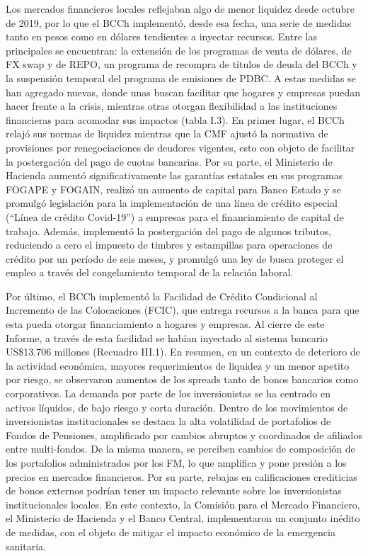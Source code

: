 \documentclass[
]{book}
\begin{document}
Los mercados financieros locales reflejaban algo de menor liquidez desde
octubre de 2019, por lo que el BCCh implementó, desde esa fecha, una serie
de medidas tanto en pesos como en dólares tendientes a inyectar recursos.
Entre las principales se encuentran: la extensión de los programas de venta de
dólares, de FX swap y de REPO, un programa de recompra de títulos de deuda
del BCCh y la suspensión temporal del programa de emisiones de PDBC.
A estas medidas se han agregado nuevas, donde unas buscan facilitar que
hogares y empresas puedan hacer frente a la crisis, mientras otras otorgan
flexibilidad a las instituciones financieras para acomodar sus impactos (tabla
I.3). En primer lugar, el BCCh relajó sus normas de liquidez mientras que la CMF
ajustó la normativa de provisiones por renegociaciones de deudores vigentes,
esto con objeto de facilitar la postergación del pago de cuotas bancarias. Por
su parte, el Ministerio de Hacienda aumentó significativamente las garantías
estatales en sus programas FOGAPE y FOGAIN, realizó un aumento de capital
para Banco Estado y se promulgó legislación para la implementación de una
línea de crédito especial (``Línea de crédito Covid-19'') a empresas para el
financiamiento de capital de trabajo. Además, implementó la postergación del
pago de algunos tributos, reduciendo a cero el impuesto de timbres y estampillas
para operaciones de crédito por un período de seis meses, y promulgó una ley
de busca proteger el empleo a través del congelamiento temporal de la relación
laboral.

Por último, el BCCh implementó la Facilidad de Crédito Condicional al
Incremento de las Colocaciones (FCIC), que entrega recursos a la banca para
que esta pueda otorgar financiamiento a hogares y empresas. Al cierre de este
Informe, a través de esta facilidad se habían inyectado al sistema bancario
US\$13.706 millones (Recuadro III.1).
En resumen, en un contexto de deterioro de la actividad económica, mayores
requerimientos de liquidez y un menor apetito por riesgo, se observaron
aumentos de los spreads tanto de bonos bancarios como corporativos. La
demanda por parte de los inversionistas se ha centrado en activos líquidos,
de bajo riesgo y corta duración. Dentro de los movimientos de inversionistas
institucionales se destaca la alta volatilidad de portafolios de Fondos de
Pensiones, amplificado por cambios abruptos y coordinados de afiliados entre
multi-fondos. De la misma manera, se perciben cambios de composición de
los portafolios administrados por los FM, lo que amplifica y pone presión a
los precios en mercados financieros. Por su parte, rebajas en calificaciones
crediticias de bonos externos podrían tener un impacto relevante sobre
los inversionistas institucionales locales. En este contexto, la Comisión
para el Mercado Financiero, el Ministerio de Hacienda y el Banco Central,
implementaron un conjunto inédito de medidas, con el objeto de mitigar el
impacto económico de la emergencia sanitaria.
\end{document}

